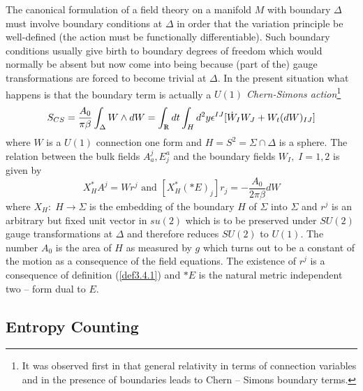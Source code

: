 \documentclass[12pt]{report}
\def\be{\begin{equation}}
\def\ee{\end{equation}}
\def\Rl{{\mathchoice
{\setbox0=\hbox{$\displaystyle\rm R$}\hbox{\hbox to0pt
{\kern0.4\wd0\vrule height0.9\ht0\hss}\box0}}
{\setbox0=\hbox{$\textstyle\rm R$}\hbox{\hbox to0pt
{\kern0.4\wd0\vrule height0.9\ht0\hss}\box0}}
{\setbox0=\hbox{$\scriptstyle\rm R$}\hbox{\hbox to0pt
{\kern0.4\wd0\vrule height0.9\ht0\hss}\box0}}
{\setbox0=\hbox{$\scriptscriptstyle\rm R$}\hbox{\hbox to0pt
{\kern0.4\wd0\vrule height0.9\ht0\hss}\box0}}}}
\begin{document}
%
The canonical formulation of a field theory on a manifold $M$ with 
boundary $\Delta$ must involve boundary conditions at $\Delta$ in order 
that the variation principle be well-defined (the action must be 
functionally differentiable). Such boundary conditions usually give birth
to boundary degrees of freedom \cite{60} which would normally be absent but 
now 
come into being because (part of the) gauge transformations are forced to
become trivial at $\Delta$. In the present situation what happens is that 
the boundary term is actually a {\it $U(1)$ Chern-Simons 
action}\footnote{It was observed first in \cite{60a} that general 
relativity in terms of connection variables and in the presence of 
boundaries leads to Chern -- Simons boundary terms.} 
\be \label{3.4.2}
S_{CS}=\frac{A_0}{\pi\beta} 
\int_{\Delta} W\wedge dW=\int_\Rl dt \int_{H} d^2y 
\epsilon^{IJ}[\dot{W}_I W_J+W_t (dW)_{IJ}]
\ee
where $W$ is a $U(1)$ connection one form and $H=S^2=\Sigma\cap \Delta$ 
is a sphere.
The relation between the bulk fields $A_a^j,E^a_j$ and the boundary fields
$W_I,\;I=1,2$ is given by
\be \label{3.4.3}
X_H^\ast A^j=W r^j\mbox{ and } 
[X_H^\ast(\ast E)_j]r_j=-\frac{A_0}{2\pi\beta} dW
\ee
where $X_H:\;H\to \Sigma$ is the embedding of the boundary $H$ of 
$\Sigma$ into $\Sigma$ and $r^j$ is an arbitrary but fixed unit vector in 
$su(2)$ which is to be preserved under $SU(2)$ gauge transformations at 
$\Delta$ and therefore reduces $SU(2)$ to $U(1)$. The number $A_0$ is 
the area of $H$ as measured by $g$ which turns out to be a constant of the 
motion as a consequence of the field equations. The existence of $r^j$ 
is a consequence of definition (\ref{def3.4.1}) and $\ast E$ is the 
natural metric independent two -- form dual to $E$. 

\subsection{Entropy Counting}
\label{s3.4.2}
\end{document}
